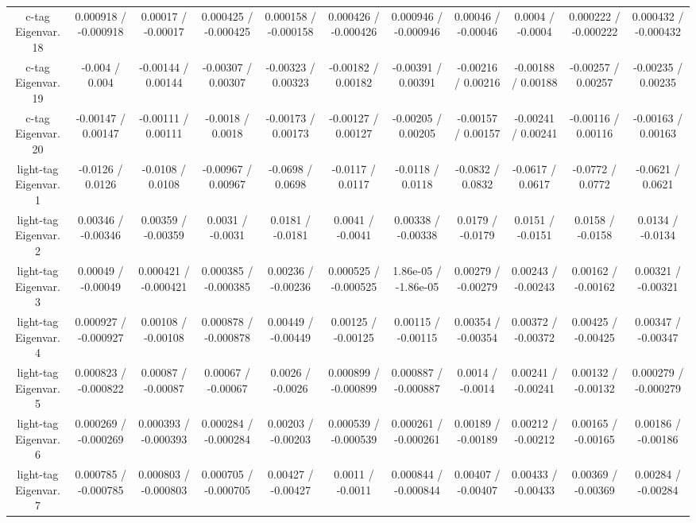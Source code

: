 \begin{table}[htbp]
\begin{center}
\begin{tabular}{|c|c|c|c|c|c|c|c|c|c|c|}
  c-tag Eigenvar. 18 & 0.000918 / -0.000918 & 0.00017 / -0.00017 & 0.000425 / -0.000425 & 0.000158 / -0.000158 & 0.000426 / -0.000426 & 0.000946 / -0.000946 & 0.00046 / -0.00046 & 0.0004 / -0.0004 & 0.000222 / -0.000222 & 0.000432 / -0.000432 \\ 
  c-tag Eigenvar. 19 & -0.004 / 0.004 & -0.00144 / 0.00144 & -0.00307 / 0.00307 & -0.00323 / 0.00323 & -0.00182 / 0.00182 & -0.00391 / 0.00391 & -0.00216 / 0.00216 & -0.00188 / 0.00188 & -0.00257 / 0.00257 & -0.00235 / 0.00235 \\ 
  c-tag Eigenvar. 20 & -0.00147 / 0.00147 & -0.00111 / 0.00111 & -0.0018 / 0.0018 & -0.00173 / 0.00173 & -0.00127 / 0.00127 & -0.00205 / 0.00205 & -0.00157 / 0.00157 & -0.00241 / 0.00241 & -0.00116 / 0.00116 & -0.00163 / 0.00163 \\ 
  light-tag Eigenvar. 1 & -0.0126 / 0.0126 & -0.0108 / 0.0108 & -0.00967 / 0.00967 & -0.0698 / 0.0698 & -0.0117 / 0.0117 & -0.0118 / 0.0118 & -0.0832 / 0.0832 & -0.0617 / 0.0617 & -0.0772 / 0.0772 & -0.0621 / 0.0621 \\ 
  light-tag Eigenvar. 2 & 0.00346 / -0.00346 & 0.00359 / -0.00359 & 0.0031 / -0.0031 & 0.0181 / -0.0181 & 0.0041 / -0.0041 & 0.00338 / -0.00338 & 0.0179 / -0.0179 & 0.0151 / -0.0151 & 0.0158 / -0.0158 & 0.0134 / -0.0134 \\ 
  light-tag Eigenvar. 3 & 0.00049 / -0.00049 & 0.000421 / -0.000421 & 0.000385 / -0.000385 & 0.00236 / -0.00236 & 0.000525 / -0.000525 & 1.86e-05 / -1.86e-05 & 0.00279 / -0.00279 & 0.00243 / -0.00243 & 0.00162 / -0.00162 & 0.00321 / -0.00321 \\ 
  light-tag Eigenvar. 4 & 0.000927 / -0.000927 & 0.00108 / -0.00108 & 0.000878 / -0.000878 & 0.00449 / -0.00449 & 0.00125 / -0.00125 & 0.00115 / -0.00115 & 0.00354 / -0.00354 & 0.00372 / -0.00372 & 0.00425 / -0.00425 & 0.00347 / -0.00347 \\ 
  light-tag Eigenvar. 5 & 0.000823 / -0.000822 & 0.00087 / -0.00087 & 0.00067 / -0.00067 & 0.0026 / -0.0026 & 0.000899 / -0.000899 & 0.000887 / -0.000887 & 0.0014 / -0.0014 & 0.00241 / -0.00241 & 0.00132 / -0.00132 & 0.000279 / -0.000279 \\ 
  light-tag Eigenvar. 6 & 0.000269 / -0.000269 & 0.000393 / -0.000393 & 0.000284 / -0.000284 & 0.00203 / -0.00203 & 0.000539 / -0.000539 & 0.000261 / -0.000261 & 0.00189 / -0.00189 & 0.00212 / -0.00212 & 0.00165 / -0.00165 & 0.00186 / -0.00186 \\ 
  light-tag Eigenvar. 7 & 0.000785 / -0.000785 & 0.000803 / -0.000803 & 0.000705 / -0.000705 & 0.00427 / -0.00427 & 0.0011 / -0.0011 & 0.000844 / -0.000844 & 0.00407 / -0.00407 & 0.00433 / -0.00433 & 0.00369 / -0.00369 & 0.00284 / -0.00284 \\ 

\end{tabular}
\end{center}
\end{table}
